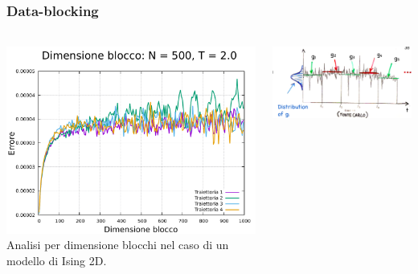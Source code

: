 \begin{frame}
    \frametitle{Data-blocking}
    \framesubtitle{}

    \begin{columns}

        \begin{column}{0.55\textwidth}

            \centering
            \includegraphics[width=\textwidth]{Immagini/metodiNumerici/err_500_2.0.pdf}
            \newline
            {\scriptsize Analisi per dimensione blocchi nel caso di un modello di Ising 2D.}

        \end{column}


        \begin{column}{0.45\textwidth}

            \centering
            \includegraphics[width=\textwidth]{Immagini/metodiNumerici/data_blocking.png}


\end{column}
\end{columns}
\end{frame}
